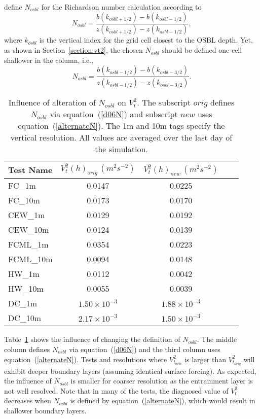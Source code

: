 \documentclass[preprint,12pt,authoryear]{agujournal}
\begin{document}
\cite{Danabasoglu2006} define $N_{osbl}$ for the Richardson number calculation according to 
\begin{equation}
\label{d06N}
N_{osbl} = \frac{b(k_{osbl+1/2}) - b(k_{osbl-1/2})}{z(k_{osbl+1/2}) - z(k_{osbl-1/2})},
\end{equation}
where $k_{osbl}$ is the vertical index for the grid cell closest to the OSBL depth. Yet, as shown in Section~\ref{section:vt2}, the chosen $N_{osbl}$ should be defined one cell shallower in the column, i.e., 
\begin{equation}
\label{alternateN}
N_{osbl} = \frac{b(k_{osbl-1/2}) - b(k_{osbl-3/2})}{z(k_{osbl-1/2}) - z(k_{osbl-3/2})}.
\end{equation}

\begin{table}
	\centering
	\def\arraystretch{1.5}
	\begin{tabular}{ l  c  c  c  c  }
		\hline
		Test Name & $V_t^2(h)_{orig} \, (m^2 s^{-2}) $ & $V_t^2(h)_{new} \, (m^2 s^{-2})$ \\
		\hline
        FC\_1m & 0.0147 & 0.0225  \\
        FC\_10m &  0.0173 & 0.0170 \\
        CEW\_1m & 0.0129 & 0.0192 \\
        CEW\_10m & 0.0124 & 0.0139\\
        FCML\_1m & 0.0354 & 0.0223 \\
        FCML\_10m & 0.0094 & 0.0148 \\
        HW\_1m & 0.0112 & 0.0042 \\
        HW\_10m &  0.0055 & 0.0039\\
        DC\_1m &  $1.50 \times 10^{-3}$ & $1.88 \times 10^{-3}$  \\
        DC\_10m & $2.17 \times 10^{-3}$ & $1.50 \times 10^{-3}$ \\
        \hline
        
	\end{tabular}
	\caption{Influence of alteration of $N_{osbl}$ on $V_t^2$.  The subscript $orig$ defines $N_{osbl}$ via equation~(\ref{d06N}) and subscript $new$ uses equation~(\ref{alternateN}). The 1m and 10m tags specify the vertical resolution.  All values are averaged over the last day of the simulation.} 
	\label{Table:N2_influence}
\end{table}

Table~\ref{Table:N2_influence} shows the influence of changing the definition of $N_{osbl}$.  The middle column defines $N_{osbl}$ via equation~(\ref{d06N}) and the third column uses equation~(\ref{alternateN}).  Tests and resolutions where $V_{t_{new}}^2$ is larger than $V_{t_{orig}}^2$ will exhibit deeper boundary layers (assuming identical surface forcing).  As expected, the influence of $N_{osbl}$ is smaller for coarser resolution as the entrainment layer is not well resolved.  Note that in many of the tests, the diagnosed value of $V_t^2$ decreases when $N_{osbl}$ is defined by equation~(\ref{alternateN}), which would result in shallower boundary layers.
\end{document}
